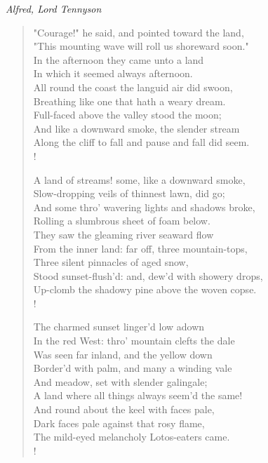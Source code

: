 \documentclass[10pt]{memoir}
\newcommand{\poemauthor}[1]{{\small\itshape #1}\par\medskip}
\begin{document}
\clearpage

\poemauthor{Alfred, Lord Tennyson}

\begin{verse}
"Courage!" he said, and pointed toward the land,\\
"This mounting wave will roll us shoreward soon."\\
In the afternoon they came unto a land\\
In which it seemed always afternoon.\\
All round the coast the languid air did swoon,\\
Breathing like one that hath a weary dream.\\
Full-faced above the valley stood the moon;\\
And like a downward smoke, the slender stream\\
Along the cliff to fall and pause and fall did seem.\\!

A land of streams! some, like a downward smoke,\\
Slow-dropping veils of thinnest lawn, did go;\\
And some thro' wavering lights and shadows broke,\\
Rolling a slumbrous sheet of foam below.\\
They saw the gleaming river seaward flow\\
From the inner land: far off, three mountain-tops,\\
Three silent pinnacles of aged snow,\\
Stood sunset-flush'd: and, dew'd with showery drops,\\
Up-clomb the shadowy pine above the woven copse.\\!

The charmed sunset linger'd low adown\\
In the red West: thro' mountain clefts the dale\\
Was seen far inland, and the yellow down\\
Border'd with palm, and many a winding vale\\
And meadow, set with slender galingale;\\
A land where all things always seem'd the same!\\
And round about the keel with faces pale,\\
Dark faces pale against that rosy flame,\\
The mild-eyed melancholy Lotos-eaters came.\\!


\end{verse}
\end{document}
